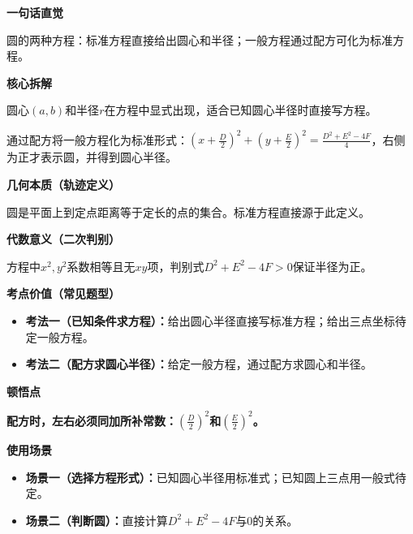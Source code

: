 \begin{explanationbox}
	\textbf{\textcolor{CExplanation}{一句话直觉}}

	圆的两种方程：标准方程直接给出圆心和半径；一般方程通过配方可化为标准方程。

	\medskip
	\textbf{\textcolor{CExplanation}{核心拆解}}
	\begin{description}[style=nextline, leftmargin=2.8em, labelsep=0.5em, itemsep=0.45em]
		\item[\textbf{要点一（标准方程结构）：}]圆心$(a,b)$和半径$r$在方程中显式出现，适合已知圆心半径时直接写方程。
		\item[\textbf{要点二（一般方程配方）：}]通过配方将一般方程化为标准形式：$(x+\frac{D}{2})^2+(y+\frac{E}{2})^2=\frac{D^2+E^2-4F}{4}$，右侧为正才表示圆，并得到圆心半径。
	\end{description}

	\medskip
	\textbf{\textcolor{CExplanation}{几何本质（轨迹定义）}}

	圆是平面上到定点距离等于定长的点的集合。标准方程直接源于此定义。

	\medskip
	\textbf{\textcolor{CExplanation}{代数意义（二次判别）}}

	方程中$x^2,y^2$系数相等且无$xy$项，判别式$D^2+E^2-4F>0$保证半径为正。

	\medskip
	\textbf{\textcolor{CExplanation}{考点价值（常见题型）}}
	\begin{itemize}[leftmargin=*, itemsep=0.5em, topsep=0.4em]
		\item \textbf{考法一（已知条件求方程）：}给出圆心半径直接写标准方程；给出三点坐标待定一般方程。
		\item \textbf{考法二（配方求圆心半径）：}给定一般方程，通过配方求圆心和半径。
	\end{itemize}

	\medskip
	\textbf{\textcolor{CExplanation}{顿悟点}}

	\textbf{配方时，左右必须同加所补常数：$(\frac{D}{2})^2$和$(\frac{E}{2})^2$。}

	\medskip
	\textbf{\textcolor{CExplanation}{使用场景}}
	\begin{itemize}[leftmargin=*, itemsep=0.5em, topsep=0.4em]
		\item \textbf{场景一（选择方程形式）：}已知圆心半径用标准式；已知圆上三点用一般式待定。
		\item \textbf{场景二（判断圆）：}直接计算$D^2+E^2-4F$与0的关系。
	\end{itemize}
\end{explanationbox}
